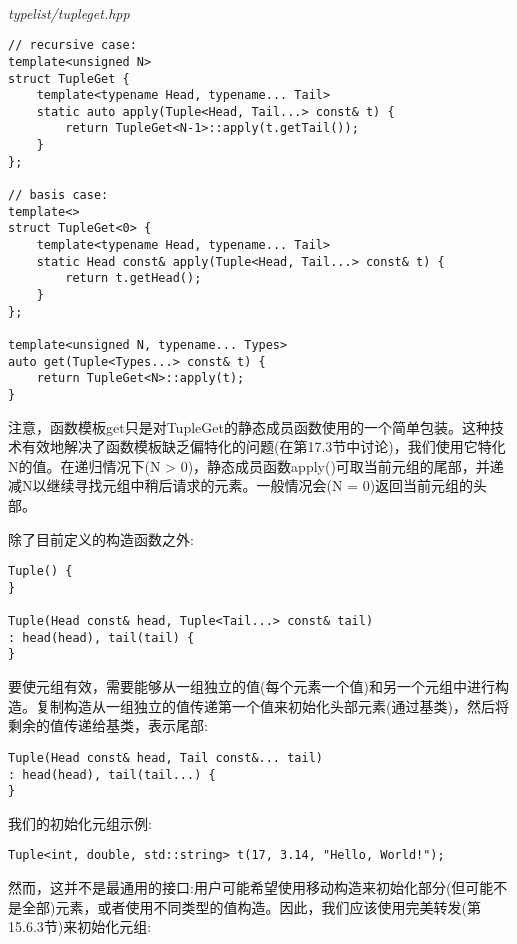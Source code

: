 \hspace*{\fill} \\ %
\noindent
\textit{typelist/tupleget.hpp}
\begin{lstlisting}[style=styleCXX]
// recursive case:
template<unsigned N>
struct TupleGet {
	template<typename Head, typename... Tail>
	static auto apply(Tuple<Head, Tail...> const& t) {
		return TupleGet<N-1>::apply(t.getTail());
	}
};

// basis case:
template<>
struct TupleGet<0> {
	template<typename Head, typename... Tail>
	static Head const& apply(Tuple<Head, Tail...> const& t) {
		return t.getHead();
	}
};

template<unsigned N, typename... Types>
auto get(Tuple<Types...> const& t) {
	return TupleGet<N>::apply(t);
}
\end{lstlisting}

注意，函数模板get只是对TupleGet的静态成员函数使用的一个简单包装。这种技术有效地解决了函数模板缺乏偏特化的问题(在第17.3节中讨论)，我们使用它特化N的值。在递归情况下(N > 0)，静态成员函数apply()可取当前元组的尾部，并递减N以继续寻找元组中稍后请求的元素。一般情况会(N = 0)返回当前元组的头部。


除了目前定义的构造函数之外:

\begin{lstlisting}[style=styleCXX]
Tuple() {
}

Tuple(Head const& head, Tuple<Tail...> const& tail)
: head(head), tail(tail) {
}
\end{lstlisting}

要使元组有效，需要能够从一组独立的值(每个元素一个值)和另一个元组中进行构造。复制构造从一组独立的值传递第一个值来初始化头部元素(通过基类)，然后将剩余的值传递给基类，表示尾部:

\begin{lstlisting}[style=styleCXX]
Tuple(Head const& head, Tail const&... tail)
: head(head), tail(tail...) {
}
\end{lstlisting}

我们的初始化元组示例:

\begin{lstlisting}[style=styleCXX]
Tuple<int, double, std::string> t(17, 3.14, "Hello, World!");
\end{lstlisting}

然而，这并不是最通用的接口:用户可能希望使用移动构造来初始化部分(但可能不是全部)元素，或者使用不同类型的值构造。因此，我们应该使用完美转发(第15.6.3节)来初始化元组:

